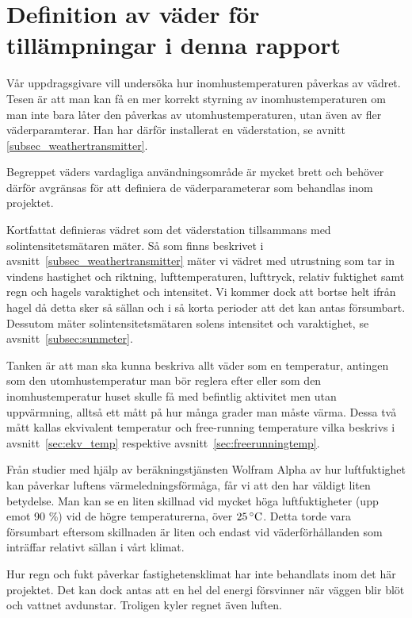 \section{Definition av väder för tillämpningar i denna rapport}
\label{subsec_weather}
Vår uppdragsgivare vill undersöka hur inomhustemperaturen påverkas av vädret. Tesen är att man kan få en mer korrekt styrning av inomhustemperaturen om man inte bara låter den påverkas av utomhustemperaturen, utan även av fler väderparamterar. Han har därför installerat en väderstation, se avnitt~ \ref{subsec_weathertransmitter}.

Begreppet väders vardagliga användningsområde är mycket brett och behöver därför avgränsas för att definiera de väderparameterar som behandlas inom projektet.

Kortfattat definieras vädret som det väderstation tillsammans med solintensitetsmätaren mäter. Så som finns beskrivet i avsnitt~\ref{subsec_weathertransmitter} mäter vi vädret med utrustning som tar in vindens hastighet och riktning, lufttemperaturen, lufttryck, relativ fuktighet samt regn och hagels varaktighet och intensitet. Vi kommer dock att bortse helt ifrån hagel då detta sker så sällan och i så korta perioder att det kan antas försumbart.  Dessutom mäter solintensitetsmätaren solens intensitet och varaktighet, se avsnitt~\ref{subsec:sunmeter}. %

Tanken är att man ska kunna beskriva allt väder som en temperatur, antingen som den utomhustemperatur man bör reglera efter eller som den inomhustemperatur huset skulle få med befintlig aktivitet men utan uppvärmning, alltså ett mått på hur många grader man måste värma. Dessa två mått kallas ekvivalent temperatur och free-running temperature vilka beskrivs i avsnitt~\ref{sec:ekv_temp} respektive avsnitt~\ref{sec:freerunningtemp}. 

Från studier med hjälp av beräkningstjänsten Wolfram Alpha\cite{wolframalpha} av hur luftfuktighet kan påverkar luftens värmeledningsförmåga, får vi att den har väldigt liten betydelse. Man kan se en liten skillnad vid mycket höga luftfuktigheter (upp emot 90 \%) vid de högre temperaturerna, över $\unit[25]{^\circ C}$. Detta torde vara försumbart eftersom skillnaden är liten och endast vid väderförhållanden som inträffar relativt sällan i vårt klimat.

Hur regn och fukt påverkar fastighetensklimat har inte behandlats inom det här projektet.
Det kan dock antas att en hel del energi försvinner när väggen blir blöt och vattnet avdunstar. Troligen kyler regnet även luften.

